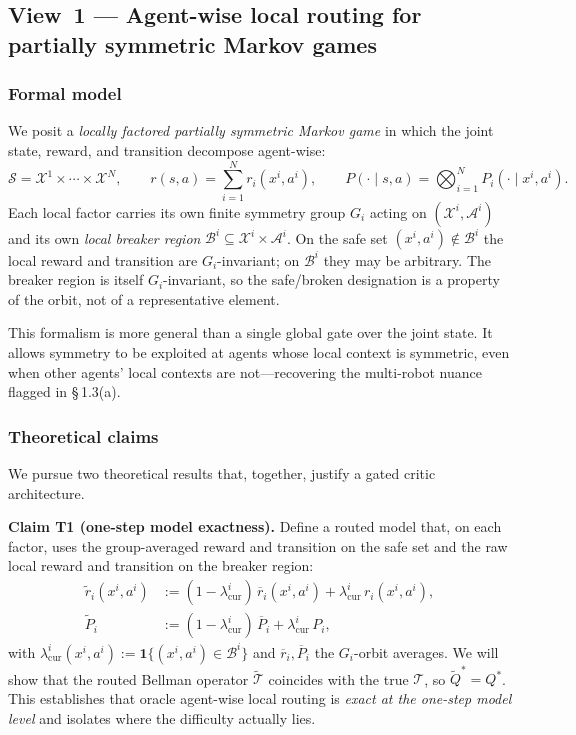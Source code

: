 \documentclass[11pt]{article}
\begin{document}
\subsection*{View~1 --- Agent-wise local routing for partially symmetric Markov games}

\subsubsection*{Formal model}

We posit a \textit{locally factored partially symmetric Markov game} in which the
joint state, reward, and transition decompose agent-wise:
\begin{equation}
\mathcal{S} = \mathcal{X}^1 \times \cdots \times \mathcal{X}^N, \qquad
r(s,a) = \sum_{i=1}^N r_i(x^i, a^i), \qquad
P(\cdot \mid s, a) = \bigotimes_{i=1}^N P_i(\cdot \mid x^i, a^i). \tag{2}
\end{equation}
Each local factor carries its own finite symmetry group $G_i$ acting on
$(\mathcal{X}^i, \mathcal{A}^i)$ and its own \textit{local breaker region}
$\mathcal{B}^i \subseteq \mathcal{X}^i \times \mathcal{A}^i$. On the safe set
$(x^i, a^i) \notin \mathcal{B}^i$ the local reward and transition are
$G_i$-invariant; on $\mathcal{B}^i$ they may be arbitrary. The breaker region
is itself $G_i$-invariant, so the safe/broken designation is a property of the
orbit, not of a representative element.

This formalism is more general than a single global gate over the joint state.
It allows symmetry to be exploited at agents whose local context is symmetric,
even when other agents' local contexts are not---recovering the multi-robot
nuance flagged in \S\,1.3(a).

\subsubsection*{Theoretical claims}

We pursue two theoretical results that, together, justify a gated critic
architecture.

\textbf{Claim T1 (one-step model exactness).} Define a routed model that, on each
factor, uses the group-averaged reward and transition on the safe set and the
raw local reward and transition on the breaker region:
\begin{equation}
\begin{split}
\widetilde{r}_i(x^i, a^i) &:= (1-\lambda^i_{\text{cur}})\,\overline{r}_i(x^i, a^i) + \lambda^i_{\text{cur}}\,r_i(x^i, a^i),\\
\widetilde{P}_i &:= (1-\lambda^i_{\text{cur}})\,\overline{P}_i + \lambda^i_{\text{cur}}\,P_i,
\end{split}
\tag{3}
\end{equation}
with $\lambda^i_{\text{cur}}(x^i, a^i) := \mathbf{1}\{(x^i, a^i) \in \mathcal{B}^i\}$
and $\overline{r}_i, \overline{P}_i$ the $G_i$-orbit averages. We will show
that the routed Bellman operator $\widetilde{\mathcal{T}}$ coincides with the
true $\mathcal{T}$, so $\widetilde{Q}^\ast = Q^\ast$. This establishes that
oracle agent-wise local routing is \textit{exact at the one-step model level} and
isolates where the difficulty actually lies.
\end{document}
